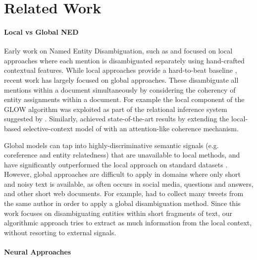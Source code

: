 \documentclass[11pt,letterpaper]{article}
\begin{document}

	\section{Related Work}
	
	\paragraph{Local vs Global NED}
	
	Early work on Named Entity Disambiguation, such as  and  focused on local approaches where each mention is disambiguated separately using hand-crafted contextual features. While local approaches provide a hard-to-beat baseline \cite{Ratinov2011}, recent work has largely focused on global approaches. These disambiguate all mentions within a document simultaneously by considering the coherency of entity assignments within a document. For example the local component of the GLOW algorithm \cite{Ratinov2011} was exploited as part of the relational inference system suggested by . Similarly,  achieved state-of-the-art results by extending the local-based selective-context model of  with an attention-like coherence mechanism.
	
	Global models can tap into highly-discriminative semantic signals (e.g. coreference and entity relatedness) that are unavailable to local methods, and have significantly outperformed the local approach on standard datasets \cite{guo2014entity,pershina2015personalized,Globerson2016}.
	However, global approaches are difficult to apply in domains where only short and noisy text is available, as often occurs in social media, questions and answers, and other short web documents. For example,  had to collect many tweets from the same author in order to apply a global disambiguation method. Since this work focuses on disambiguating entities within short fragments of text, our algorithmic approach tries to extract as much information from the local context, without resorting to external signals.

	\paragraph{Neural Approaches}
	
\end{document}
